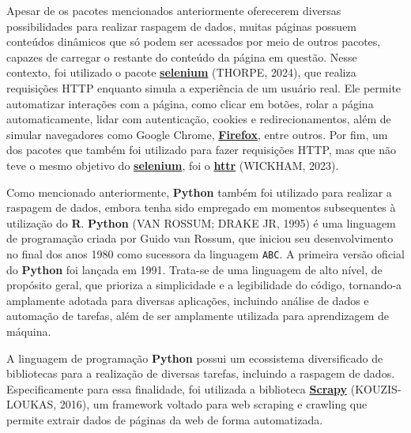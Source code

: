 \documentclass[
  12pt,
  a4paper,
]{scrreprt}
\begin{document}
\vspace{12pt}

Apesar de os pacotes mencionados anteriormente oferecerem diversas
possibilidades para realizar raspagem de dados, muitas páginas possuem
conteúdos dinâmicos que só podem ser acessados por meio de outros
pacotes, capazes de carregar o restante do conteúdo da página em
questão. Nesse contexto, foi utilizado o pacote
\href{https://cran.r-project.org/web/packages/selenium/index.html}{\textbf{selenium}}
(THORPE, 2024), que realiza requisições HTTP enquanto simula a
experiência de um usuário real. Ele permite automatizar interações com a
página, como clicar em botões, rolar a página automaticamente, lidar com
autenticação, cookies e redirecionamentos, além de simular navegadores
como Google Chrome,
\href{https://www.mozilla.org/pt-BR/firefox/}{\textbf{Firefox}}, entre
outros. Por fim, um dos pacotes que também foi utilizado para fazer
requisições HTTP, mas que não teve o mesmo objetivo do
\href{https://cran.r-project.org/web/packages/selenium/index.html}{\textbf{selenium}},
foi o \href{https://httr.r-lib.org/}{\textbf{httr}} (WICKHAM, 2023).

\vspace{12pt}

Como mencionado anteriormente, \textbf{Python} também foi utilizado para
realizar a raspagem de dados, embora tenha sido empregado em momentos
subsequentes à utilização do \textbf{R}. \textbf{Python} (VAN ROSSUM;
DRAKE JR, 1995) é uma linguagem de programação criada por Guido van
Rossum, que iniciou seu desenvolvimento no final dos anos 1980 como
sucessora da linguagem \texttt{ABC}. A primeira versão oficial do
\textbf{Python} foi lançada em 1991. Trata-se de uma linguagem de alto
nível, de propósito geral, que prioriza a simplicidade e a legibilidade
do código, tornando-a amplamente adotada para diversas aplicações,
incluindo análise de dados e automação de tarefas, além de ser
amplamente utilizada para aprendizagem de máquina.

\vspace{12pt}

A linguagem de programação \textbf{Python} possui um ecossistema
diversificado de bibliotecas para a realização de diversas tarefas,
incluindo a raspagem de dados. Especificamente para essa finalidade, foi
utilizada a biblioteca
\href{https://docs.scrapy.org/en/latest}{\textbf{Scrapy}}
(KOUZIS-LOUKAS, 2016), um framework voltado para web scraping e crawling
que permite extrair dados de páginas da web de forma automatizada.
\end{document}
